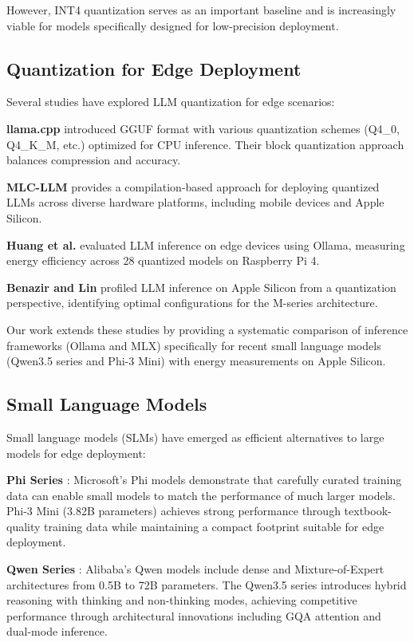 \documentclass[11pt,a4paper]{article}
\begin{document}
However, INT4 quantization serves as an important baseline and is increasingly viable for models specifically designed for low-precision deployment.

\subsection{Quantization for Edge Deployment}

Several studies have explored LLM quantization for edge scenarios:

\textbf{llama.cpp} \cite{llamacpp2023} introduced GGUF format with various quantization schemes (Q4\_0, Q4\_K\_M, etc.) optimized for CPU inference. Their block quantization approach balances compression and accuracy.

\textbf{MLC-LLM} \cite{mlcllm2023} provides a compilation-based approach for deploying quantized LLMs across diverse hardware platforms, including mobile devices and Apple Silicon.

\textbf{Huang et al.} \cite{huang2025llms} evaluated LLM inference on edge devices using Ollama, measuring energy efficiency across 28 quantized models on Raspberry Pi 4.

\textbf{Benazir and Lin} \cite{benazir2025profiling} profiled LLM inference on Apple Silicon from a quantization perspective, identifying optimal configurations for the M-series architecture.

Our work extends these studies by providing a systematic comparison of inference frameworks (Ollama and MLX) specifically for recent small language models (Qwen3.5 series and Phi-3 Mini) with energy measurements on Apple Silicon.

\subsection{Small Language Models}

Small language models (SLMs) have emerged as efficient alternatives to large models for edge deployment:

\textbf{Phi Series} \cite{javaheripi2023phi2, abdin2024phi3}: Microsoft's Phi models demonstrate that carefully curated training data can enable small models to match the performance of much larger models. Phi-3 Mini (3.82B parameters) achieves strong performance through textbook-quality training data while maintaining a compact footprint suitable for edge deployment.

\textbf{Qwen Series} \cite{qwen2025technical}: Alibaba's Qwen models include dense and Mixture-of-Expert architectures from 0.5B to 72B parameters. The Qwen3.5 series introduces hybrid reasoning with thinking and non-thinking modes, achieving competitive performance through architectural innovations including GQA attention and dual-mode inference.
\end{document}
